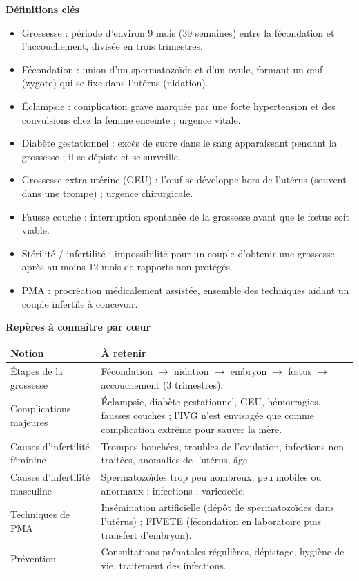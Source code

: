 \documentclass[11pt]{article}
\newcommand{\cle}[1]{{\popxbold\color{popdark}#1}}
\begin{document}
\begin{bilan}
\textbf{Définitions clés}
\begin{itemize}
  \item \cle{Grossesse} : période d'environ 9 mois (39 semaines) entre la fécondation et l'accouchement, divisée en trois trimestres.
  \item \cle{Fécondation} : union d'un spermatozoïde et d'un ovule, formant un œuf (zygote) qui se fixe dans l'utérus (\cle{nidation}).
  \item \cle{Éclampsie} : complication grave marquée par une forte hypertension et des convulsions chez la femme enceinte ; urgence vitale.
  \item \cle{Diabète gestationnel} : excès de sucre dans le sang apparaissant pendant la grossesse ; il se dépiste et se surveille.
  \item \cle{Grossesse extra-utérine (GEU)} : l'œuf se développe hors de l'utérus (souvent dans une trompe) ; urgence chirurgicale.
  \item \cle{Fausse couche} : interruption spontanée de la grossesse avant que le fœtus soit viable.
  \item \cle{Stérilité / infertilité} : impossibilité pour un couple d'obtenir une grossesse après au moins 12 mois de rapports non protégés.
  \item \cle{PMA} : procréation médicalement assistée, ensemble des techniques aidant un couple infertile à concevoir.
\end{itemize}

\textbf{Repères à connaître par cœur}
\begin{center}
\begin{tabularx}{\linewidth}{|l|X|}
\hline
\rowcolor{popblueL} \textbf{Notion} & \textbf{À retenir} \\
\hline
Étapes de la grossesse & Fécondation $\rightarrow$ nidation $\rightarrow$ embryon $\rightarrow$ fœtus $\rightarrow$ accouchement (3 trimestres). \\
\hline
Complications majeures & Éclampsie, diabète gestationnel, GEU, hémorragies, fausses couches ; l'IVG n'est envisagée que comme complication extrême pour sauver la mère. \\
\hline
Causes d'infertilité féminine & Trompes bouchées, troubles de l'ovulation, infections non traitées, anomalies de l'utérus, âge. \\
\hline
Causes d'infertilité masculine & Spermatozoïdes trop peu nombreux, peu mobiles ou anormaux ; infections ; varicocèle. \\
\hline
Techniques de PMA & Insémination artificielle (dépôt de spermatozoïdes dans l'utérus) ; FIVETE (fécondation en laboratoire puis transfert d'embryon). \\
\hline
Prévention & Consultations prénatales régulières, dépistage, hygiène de vie, traitement des infections. \\
\hline
\end{tabularx}
\end{center}


\end{bilan}
\end{document}
